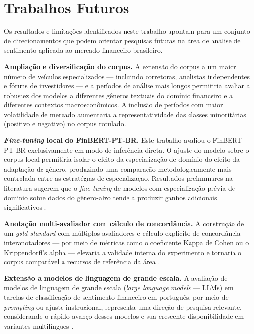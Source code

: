 
\section{Trabalhos Futuros}
\label{sec:trabalhos_futuros}

Os resultados e limitações identificados neste trabalho apontam para um conjunto de direcionamentos que podem orientar pesquisas futuras na área de análise de sentimento aplicada ao mercado financeiro brasileiro.

\textbf{Ampliação e diversificação do corpus.} A extensão do corpus a um maior número de veículos especializados --- incluindo corretoras, analistas independentes e fóruns de investidores --- e a períodos de análise mais longos permitiria avaliar a robustez dos modelos a diferentes gêneros textuais do domínio financeiro e a diferentes contextos macroeconômicos. A inclusão de períodos com maior volatilidade de mercado aumentaria a representatividade das classes minoritárias (positivo e negativo) no corpus rotulado.

\textbf{\textit{Fine-tuning} local do FinBERT-PT-BR.} Este trabalho avaliou o FinBERT-PT-BR exclusivamente em modo de inferência direta. O ajuste do modelo sobre o corpus local permitiria isolar o efeito da especialização de domínio do efeito da adaptação de gênero, produzindo uma comparação metodologicamente mais controlada entre as estratégias de especialização. Resultados preliminares na literatura sugerem que o \textit{fine-tuning} de modelos com especialização prévia de domínio sobre dados do gênero-alvo tende a produzir ganhos adicionais significativos \cite{santos2023finbert}.

\textbf{Anotação multi-avaliador com cálculo de concordância.} A construção de um \textit{gold standard} com múltiplos avaliadores e cálculo explícito de concordância interanotadores --- por meio de métricas como o coeficiente Kappa de Cohen ou o Krippendorff's alpha --- elevaria a validade interna do experimento e tornaria o corpus comparável a recursos de referência da área \cite{kearney2014}.

\textbf{Extensão a modelos de linguagem de grande escala.} A avaliação de modelos de linguagem de grande escala (\textit{large language models} --- LLMs) em tarefas de classificação de sentimento financeiro em português, por meio de \textit{prompting} ou ajuste instrucional, representa uma direção de pesquisa relevante, considerando o rápido avanço desses modelos e sua crescente disponibilidade em variantes multilíngues \cite{devlin2019}.